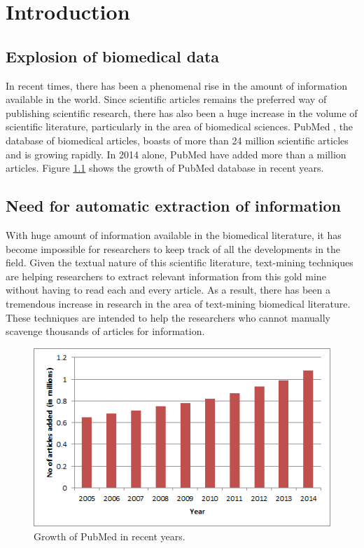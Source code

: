 \chapter{Introduction}\label{chapter:introduction}

\section{Explosion of biomedical data}

In recent times, there has been a phenomenal rise in the amount of information available in the world. Since scientific articles remains the preferred way of publishing scientific research, there has also been a huge increase in the volume of scientific literature, particularly in the area of biomedical sciences. PubMed \cite{pubmed}, the database of biomedical articles, boasts of more than 24 million scientific articles and is growing rapidly. In 2014 alone, PubMed have added more than a million articles. Figure \ref{fig:PubMedTimeLine} shows the growth of PubMed database in recent years.

\section{Need for automatic extraction of information}

With huge amount of information available in the biomedical literature, it has become impossible for researchers to keep track of all the developments in the field. Given the textual nature of this scientific literature, text-mining techniques are helping researchers to extract relevant information from this gold mine without having to read each and every article. As a result, there has been a tremendous increase in research in the area of text-mining biomedical literature. These techniques are intended to help the researchers who cannot manually scavenge thousands of articles for information.

\begin{figure}
\centering
\includegraphics[scale=1]{figures/PubMedTimeLine.png}
\caption{Growth of PubMed in recent years.}\label{fig:PubMedTimeLine}
\end{figure}

